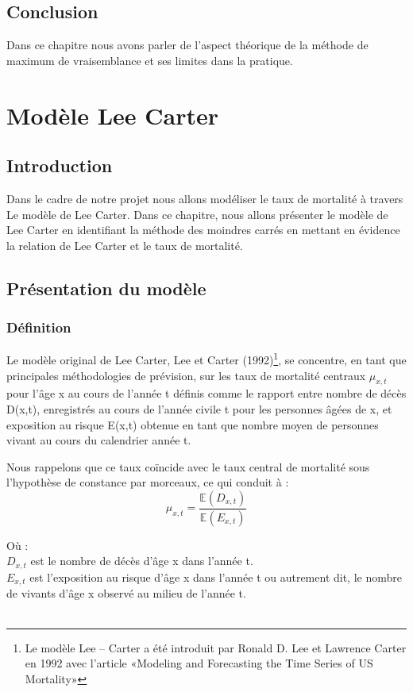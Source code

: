 \documentclass[french]{report}
\begin{document}
\section{Conclusion}
Dans ce chapitre nous avons parler de l'aspect théorique de la méthode de maximum de vraisemblance et ses limites dans la pratique.


\chapter{Modèle Lee Carter}
\section{Introduction}
Dans le cadre de notre projet nous allons modéliser le taux de mortalité à travers Le modèle de Lee Carter.
Dans ce chapitre, nous allons présenter le modèle de Lee Carter en identifiant la méthode des moindres carrés en mettant en évidence la relation de Lee Carter et le taux de mortalité.



\section{Présentation du modèle}
\subsection{Définition}


Le modèle original de Lee Carter, Lee et Carter (1992)\footnote{Le modèle Lee – Carter a été introduit par Ronald D. Lee et Lawrence Carter en 1992 avec l'article «Modeling and Forecasting the Time Series of US Mortality»}, se concentre, en tant que principales méthodologies de prévision,
sur les taux de mortalité centraux $\mu_ {x,t}$ pour l'âge x au cours de l'année t définis comme le rapport entre
nombre de décès D(x,t), enregistrés au cours de l'année civile t pour les personnes âgées de x, et
exposition au risque E(x,t) obtenue en tant que nombre moyen de personnes vivant au cours du calendrier
année t.

Nous rappelons que ce taux coïncide avec le taux central de mortalité sous l'hypothèse
de constance par morceaux, ce qui conduit à :\\

    \[ \mu_ {x,t} = \frac{\mathbb{E}(D_{x,t})}{\mathbb{E}(E_{x,t})} \] 

  Où :\\
$D_{x,t} $  est le nombre de décès d'âge x dans l'année t.\\
$E_{x,t}$   est l'exposition au risque d'âge x dans l'année t ou autrement dit, le nombre de vivants
d'âge x observé au milieu de l'année t. \\
\\
\end{document}
